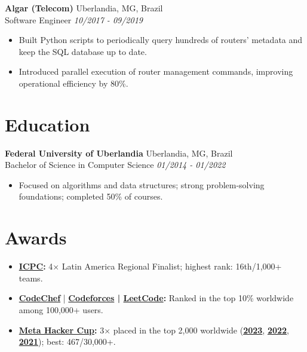 \documentclass[a4paper,10pt]{article}
\begin{document}
\textbf{Algar (Telecom)}
    \hfill Uberlandia, MG, Brazil 
    \\ Software Engineer
    \hfill \textit{10/2017 - 09/2019}
\begin{itemize}
    \item Built Python scripts to periodically query hundreds of routers' metadata and keep the SQL database up to date.
    \item Introduced parallel execution of router management commands, improving operational efficiency by 80\%.
\end{itemize}

\section*{Education}

\textbf{Federal University of Uberlandia} 
    \hfill Uberlandia, MG, Brazil
    \\Bachelor of Science in Computer Science
    \hfill \textit{01/2014 - 01/2022}
\begin{itemize}
    \item Focused on algorithms and data structures; strong problem-solving foundations; completed 50\% of courses.
\end{itemize}

\section*{Awards}
\begin{itemize}
    \item \textbf{\href{https://icpc.global/ICPCID/SP7WIXMME8B8}{ICPC}:} 4× Latin America Regional Finalist; highest rank: 16th/1,000+ teams.
    \item \textbf{\href{https://www.codechef.com/users/gardusig}{CodeChef}} | \textbf{\href{https://codeforces.com/profile/gardusig}{Codeforces} | \href{https://leetcode.com/u/ggardusi/}{LeetCode}:} Ranked in the top 10\% worldwide among 100,000+ users.    
    \item \textbf{\href{https://www.facebook.com/codingcompetitions/hacker-cup}{Meta Hacker Cup}:} 3× placed in the top 2,000 worldwide (\textbf{\href{https://www.facebook.com/codingcompetitions/hacker-cup/2023/certificate/490890632182886}{2023}}, \textbf{\href{https://www.facebook.com/codingcompetitions/hacker-cup/2022/certificate/490890632182886}{2022}}, \textbf{\href{https://www.facebook.com/codingcompetitions/hacker-cup/2021/certificate/490890632182886}{2021}}); best: 467/30,000+.
\end{itemize}
\end{document}
